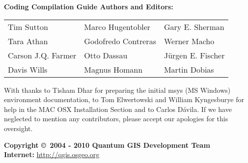 \begin{flushleft}
\textbf{Coding Compilation Guide Authors and Editors:}
 
\begin{tabular}{p{5cm} p{5cm} p{5cm}}
Tim Sutton & Marco Hugentobler & Gary E. Sherman \\
Tara Athan & Godofredo Contreras & Werner Macho \\
Carson J.Q. Farmer & Otto Dassau & J\"urgen E. Fischer \\
Davis Wills & Magnus Homann & Martin Dobias \\ 
\end{tabular}

With thanks to Tisham Dhar for preparing the initial msys (MS Windows)
environment documentation, to Tom Elwertowski and William Kyngesburye for
help in the MAC OSX Installation Section and to Carlos D\'{a}vila. If we have
neglected to mention any contributors, please accept our apologies for this
oversight.

\vspace{0.5cm}

\textbf{Copyright \copyright~2004 - 2010 Quantum GIS Development Team} \\
\textbf{Internet:} \url{http://qgis.osgeo.org}
\end{flushleft}

